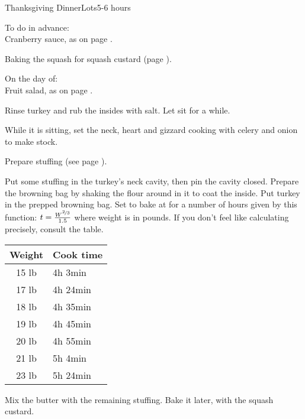 \documentclass[../Cookbook.tex]{subfiles}
\begin{document}
\begin{recipe}{Thanksgiving Dinner}{Lots}{5-6 hours}

To do in advance: \\
Cranberry sauce, as on page \pageref{CranberrySauce}.

Baking the squash for squash custard (page \pageref{SquashCustard}).

\newstep
On the day of: \\
Fruit salad, as on page \pageref{FruitSalad}.

Rinse turkey and rub the insides with salt. Let sit for a while.

While it is sitting, set the neck, heart and gizzard cooking with celery and onion to make stock.

Prepare stuffing (see page \pageref{Stuffing}).

\begin{minipage}{.7\textwidth}
	Put some stuffing in the turkey's neck cavity, then pin the cavity closed.
	Prepare the browning bag by shaking the flour around in it to coat the inside.
	Put turkey in the prepped browning bag.
	Set to bake at  for a number of hours given by this function:
	$ t = \frac{W^{\nicefrac{2}{3}}}{1.5} $
	where weight is in pounds.
	If you don't feel like calculating precisely, consult the table.
\end{minipage}
\begin{minipage}{.29\textwidth}
	\begin{tabular}{cl}
		Weight & Cook time \\ \hline
		15 lb & 4h 3min \\
		17 lb & 4h 24min \\
		18 lb & 4h 35min \\
		19 lb & 4h 45min \\
		20 lb & 4h 55min \\
		21 lb & 5h 4min \\
		23 lb & 5h 24min
	\end{tabular}
\end{minipage}

Mix the butter with the remaining stuffing. Bake it later, with the squash custard.


\end{recipe}
\end{document}
